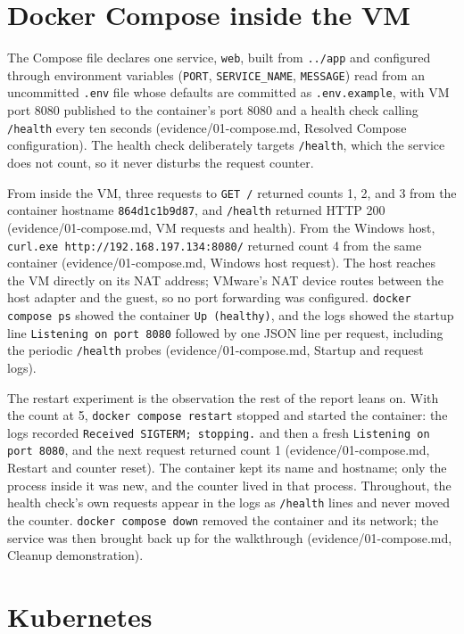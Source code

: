 \documentclass[11pt,letterpaper]{article}
\newcommand{\evid}[2]{\textsf{\footnotesize(evidence/#1, #2)}}
\newcommand{\code}[1]{\texttt{#1}}
\begin{document}
\section{Docker Compose inside the VM}

The Compose file declares one service, \code{web}, built from \code{../app} and configured through environment variables (\code{PORT}, \code{SERVICE\_NAME}, \code{MESSAGE}) read from an uncommitted \code{.env} file whose defaults are committed as \code{.env.example}, with VM port 8080 published to the container's port 8080 and a health check calling \code{/health} every ten seconds \evid{01-compose.md}{Resolved Compose configuration}. The health check deliberately targets \code{/health}, which the service does not count, so it never disturbs the request counter.

From inside the VM, three requests to \code{GET /} returned counts 1, 2, and 3 from the container hostname \code{864d1c1b9d87}, and \code{/health} returned HTTP 200 \evid{01-compose.md}{VM requests and health}. From the Windows host, \code{curl.exe http://192.168.197.134:8080/} returned count 4 from the same container \evid{01-compose.md}{Windows host request}. The host reaches the VM directly on its NAT address; VMware's NAT device routes between the host adapter and the guest, so no port forwarding was configured. \code{docker compose ps} showed the container \code{Up (healthy)}, and the logs showed the startup line \code{Listening on port 8080} followed by one JSON line per request, including the periodic \code{/health} probes \evid{01-compose.md}{Startup and request logs}.

The restart experiment is the observation the rest of the report leans on. With the count at 5, \code{docker compose restart} stopped and started the container: the logs recorded \code{Received SIGTERM; stopping.} and then a fresh \code{Listening on port 8080}, and the next request returned count 1 \evid{01-compose.md}{Restart and counter reset}. The container kept its name and hostname; only the process inside it was new, and the counter lived in that process. Throughout, the health check's own requests appear in the logs as \code{/health} lines and never moved the counter. \code{docker compose down} removed the container and its network; the service was then brought back up for the walkthrough \evid{01-compose.md}{Cleanup demonstration}.

\section{Kubernetes}
\end{document}
